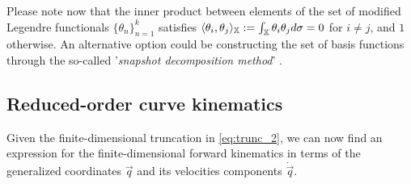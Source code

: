 Please note now that the inner product between elements of the set of modified Legendre functionals $\{\theta_n\}_{n = 1}^k$ satisfies $\langle {\theta_i}, {\theta_j} \rangle_{\mathbb{X}} := \int_{\mathbb{X}}{\theta_i}{\theta_j} d\sigma = 0$ for $i \neq j$, and $1$ otherwise. An alternative option could be constructing the set of basis functions through the so-called '\textit{snapshot decomposition method}' \cite{Astrid2008,Duriez2013,Largilliere2015}.


\subsection{Reduced-order curve kinematics}
Given the finite-dimensional truncation in \eqref{eq:trunc_2}, we can now find an expression for the finite-dimensional forward kinematics in terms of the generalized coordinates $\vec{q}$ and its velocities components $\dot{\vec{q}}$.

